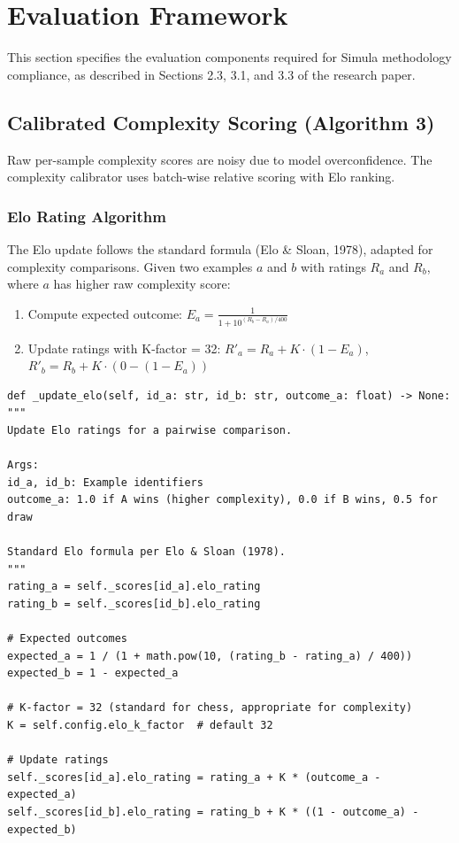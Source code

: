 \documentclass[12pt,a4paper,twoside]{report}
\begin{document}
\chapter{Evaluation Framework}
\label{chap:evaluation}

This section specifies the evaluation components required for Simula methodology
compliance, as described in Sections 2.3, 3.1, and 3.3 of the research paper.

\section{Calibrated Complexity Scoring (Algorithm 3)}

Raw per-sample complexity scores are noisy due to model overconfidence.
The complexity calibrator uses batch-wise relative scoring with Elo ranking.

\subsection{Elo Rating Algorithm}

The Elo update follows the standard formula (Elo \& Sloan, 1978), adapted for
complexity comparisons. Given two examples $a$ and $b$ with ratings $R_a$ and
$R_b$, where $a$ has higher raw complexity score:

\begin{enumerate}[nosep]
\item Compute expected outcome:
$E_a = \frac{1}{1 + 10^{(R_b - R_a)/400}}$
\item Update ratings with K-factor = 32:
$R'_a = R_a + K \cdot (1 - E_a)$,
$R'_b = R_b + K \cdot (0 - (1 - E_a))$
\end{enumerate}

\begin{lstlisting}[language=jsonx,caption={Elo computation (simula\_complexity\_calibrator.py)}]
def _update_elo(self, id_a: str, id_b: str, outcome_a: float) -> None:
"""
Update Elo ratings for a pairwise comparison.

Args:
id_a, id_b: Example identifiers
outcome_a: 1.0 if A wins (higher complexity), 0.0 if B wins, 0.5 for draw

Standard Elo formula per Elo & Sloan (1978).
"""
rating_a = self._scores[id_a].elo_rating
rating_b = self._scores[id_b].elo_rating

# Expected outcomes
expected_a = 1 / (1 + math.pow(10, (rating_b - rating_a) / 400))
expected_b = 1 - expected_a

# K-factor = 32 (standard for chess, appropriate for complexity)
K = self.config.elo_k_factor  # default 32

# Update ratings
self._scores[id_a].elo_rating = rating_a + K * (outcome_a - expected_a)
self._scores[id_b].elo_rating = rating_b + K * ((1 - outcome_a) - expected_b)
\end{lstlisting}
\end{document}
